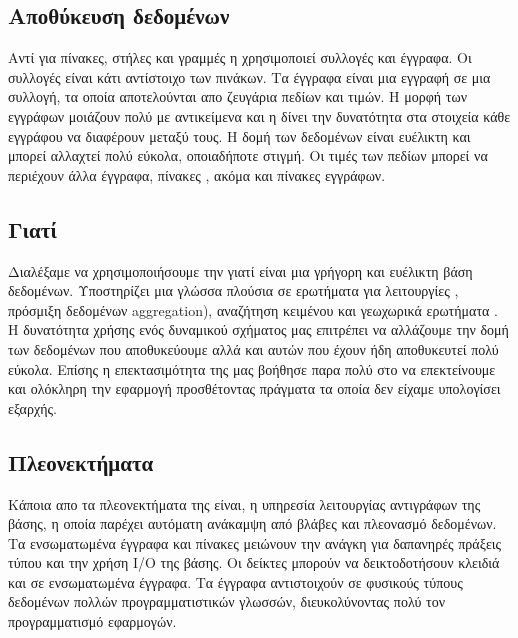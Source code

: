 \subsection*{Αποθύκευση δεδομένων}
\pSpace Αντί για πίνακες, στήλες και γραμμές η  χρησιμοποιεί συλλογές και έγγραφα. Οι συλλογές είναι κάτι αντίστοιχο των πινάκων. Τα έγγραφα είναι μια εγγραφή σε μια συλλογή, τα οποία αποτελούνται απο ζευγάρια πεδίων και τιμών. Η μορφή των εγγράφων μοιάζουν πολύ με αντικείμενα  και η  δίνει την δυνατότητα στα στοιχεία κάθε εγγράφου να διαφέρουν μεταξύ τους. Η δομή των δεδομένων είναι ευέλικτη και μπορεί αλλαχτεί πολύ εύκολα, οποιαδήποτε στιγμή. Οι τιμές των πεδίων μπορεί να περιέχουν άλλα έγγραφα, πίνακες , ακόμα και πίνακες  εγγράφων.

\subsection*{Γιατί}
\quad Διαλέξαμε να χρησιμοποιήσουμε την  γιατί είναι μια γρήγορη και ευέλικτη βάση δεδομένων. Υποστηρίζει μια γλώσσα πλούσια σε ερωτήματα για λειτουργίες , πρόσμιξη δεδομένων  aggregation), αναζήτηση κειμένου και γεωχωρικά ερωτήματα . Η δυνατότητα χρήσης ενός δυναμικού σχήματος  μας επιτρέπει να αλλάζουμε την δομή των δεδομένων που αποθυκεύουμε αλλά και αυτών που έχουν ήδη αποθυκευτεί πολύ εύκολα. Επίσης η επεκτασιμότητα της μας βοήθησε παρα πολύ στο να επεκτείνουμε και ολόκληρη την εφαρμογή προσθέτοντας πράγματα τα οποία δεν είχαμε υπολογίσει εξαρχής.
 
\subsection*{Πλεονεκτήματα}
\quad Κάποια απο τα πλεονεκτήματα της  είναι, η υπηρεσία λειτουργίας αντιγράφων της βάσης, η οποία παρέχει αυτόματη ανάκαμψη από βλάβες και πλεονασμό δεδομένων. Τα ενσωματωμένα έγγραφα και πίνακες μειώνουν την ανάγκη για δαπανηρές πράξεις τύπου  και την χρήση I/O της βάσης. Οι δείκτες μπορούν να δεικτοδοτήσουν κλειδιά και σε ενσωματωμένα έγγραφα. Τα έγγραφα αντιστοιχούν σε φυσικούς  τύπους δεδομένων πολλών προγραμματιστικών γλωσσών, διευκολύνοντας πολύ τον προγραμματισμό εφαρμογών.

